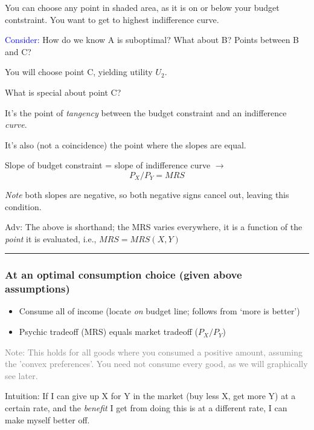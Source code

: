 \documentclass[]{article}
\providecommand{\tightlist}{%
  \setlength{\itemsep}{0pt}\setlength{\parskip}{0pt}}
\begin{document}
You can choose any point in shaded area, as it is on or below your budget contstraint. You want to get to highest indifference curve.

\textcolor{blue}{Consider:} How do we know A is suboptimal? What about B? Points between B and C?

You will choose point C, yielding utility \(U_2\).

What is special about point C?

It's the point of \emph{tangency} between the budget constraint and an indifference \emph{curve}.

It's also (not a coincidence) the point where the slopes are equal.

\bigskip

Slope of budget constraint = slope of indifference curve \(\rightarrow\)
\[P_X/P_Y = MRS\]

\emph{Note} both slopes are negative, so both negative signs cancel out, leaving this condition.

\textcolor{RawSienna}{Adv: The above is shorthand; the MRS varies everywhere, it is a function of the \emph{point} it is evaluated, i.e., $MRS = MRS(X,Y)$}

\begin{center}\rule{0.5\linewidth}{\linethickness}\end{center}

\hypertarget{at-an-optimal-consumption-choice-given-above-assumptions}{%
\subsubsection{At an optimal consumption choice (given above assumptions)}\label{at-an-optimal-consumption-choice-given-above-assumptions}}

\begin{itemize}
\tightlist
\item
  Consume all of income (locate \emph{on} budget line; follows from `more is better')
\item
  Psychic tradeoff (MRS) equals market tradeoff (\(P_X/P_Y\))
\end{itemize}

\textcolor{gray}{Note: This holds for all goods where you consumed a positive amount, assuming the 'convex preferences'.
You need not consume every good, as we will graphically see later.}

\bigskip

Intuition: If I can give up X for Y in the market (buy less X, get more Y) at a certain rate, and the \emph{benefit} I get from doing this is at a different rate, I can make myself better off.
\end{document}
